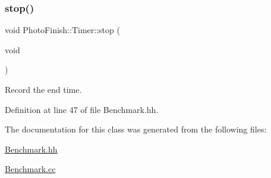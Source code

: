 \subsubsection{\texorpdfstring{stop()}{stop()}}
{\footnotesize\ttfamily void Photo\+Finish\+::\+Timer\+::stop (\begin{DoxyParamCaption}\item[{void}]{ }\end{DoxyParamCaption})\hspace{0.3cm}{\ttfamily [inline]}}



Record the end time. 



Definition at line 47 of file Benchmark.\+hh.



The documentation for this class was generated from the following files\+:\begin{DoxyCompactItemize}
\item 
\hyperlink{_benchmark_8hh}{Benchmark.\+hh}\item 
\hyperlink{_benchmark_8cc}{Benchmark.\+cc}\end{DoxyCompactItemize}
